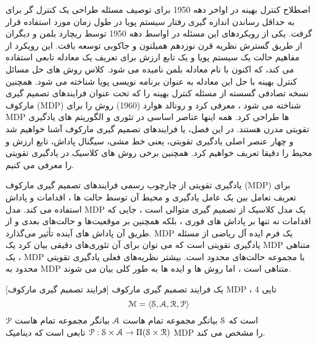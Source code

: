 

اصطلاح کنترل بهینه در اواخر دهه 1950 برای توصیف مسئله طراحی یک کنترل گر برای به حداقل رساندن اندازه گیری رفتار سیستم پویا در طول زمان مورد استفاده قرار گرفت. یکی از رویکردهای این مسئله در اواسط دهه 1950 توسط ریچارد بلمن و دیگران از طریق گسترش نظریه قرن نوزدهم همیلتون و جاکوبی توسعه یافت. این رویکرد از مفاهیم حالت یک سیستم پویا و یک تابع ارزش برای تعریف یک معادله تابعی استفاده می کند، که اکنون با نام معادله بلمن نامیده می شود. کلاس روش های حل مسائل کنترل بهینه با حل این معادله به عنوان برنامه نویسی پویا شناخته می شود. همچنین نسخه تصادفی گسسته از مسئله کنترل بهینه را که تحت عنوان فرایندهای تصمیم گیری مارکوف (MDP) شناخته می شود ، معرفی کرد و رونالد هوارد (1960) روش
  را برای MDP ها طراحی کرد. همه اینها عناصر اساسی در تئوری و الگوریتم های یادگیری تقویتی مدرن هستند.
  در این فصل، یا فرایندهای تصمیم گیری مارکوف آشنا خواهیم شد و چهار عنصر اصلی یادگیری تقویتی، یعنی خط مشی، سیگنال پاداش، تابع ارزش و محیط را دقیقا تعریف خواهیم کرد. همچنین برخی روش های کلاسیک در یادگیری تقویتی را معرفی می کنیم.




یادگیری تقویتی از چارچوب رسمی فرایندهای تصمیم گیری مارکوف (MDP) برای تعریف تعامل بین یک عامل یادگیری و محیط آن توسط حالت ها ، اقدامات و پاداش استفاده می کند. مدل MDP یک مدل کلاسیک از تصمیم گیری متوالی است ، جایی که اقدامات نه تنها بر پاداش های فوری ، بلکه همچنین بر موقعیت‌ها و حالت‌های بعدی و از طریق آن پاداش های آینده تأثیر می‌گذارد.
MDP یک فرم ایده آل ریاضی از مسئله یادگیری تقویتی است که می توان برای آن تئوری‌های دقیقی بیان کرد
یک MDP متناهی ، یک MDP با مجموعه حالت‌های محدود است. بیشتر نظریه‌های فعلی یادگیری تقویتی محدود به MDP متناهی است ، اما روش ها و ایده ها به طور کلی بیان می شوند.


[فرایند تصمیم گیری مارکوف] 
یک فرایند تصمیم گیری مارکوف
MDP
، 4 تایی 
$$\EuScript{M} = \left< \EuScript{S},\EuScript{A},\EuScript{R},\EuScript{P} \right>$$
است که
 $\EuScript{S}$ بیانگر مجموعه تمام \nf هاست
 $\EuScript{A}$ بیانگر مجموعه تمام \nf هاست
$\EuScript{P}$
$ \EuScript{P}: \EuScript{S} \times \EuScript{A} \to \Pi(\EuScript{S} \times \EuScript{R})$
تابعی است که دینامیک MDP را مشخص می کند.



